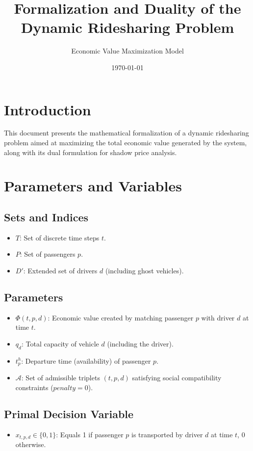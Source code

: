 \documentclass[12pt]{article}
\title{Formalization and Duality of the Dynamic Ridesharing Problem}
\author{Economic Value Maximization Model}
\date{\today}
\begin{document}
\maketitle

\section{Introduction}
This document presents the mathematical formalization of a dynamic ridesharing problem aimed at maximizing the total economic value generated by the system, along with its dual formulation for shadow price analysis.

\section{Parameters and Variables}

\subsection{Sets and Indices}
\begin{itemize}
    \item $T$: Set of discrete time steps $t$.
    \item $P$: Set of passengers $p$.
    \item $D'$: Extended set of drivers $d$ (including ghost vehicles).
\end{itemize}

\subsection{Parameters}
\begin{itemize}
    \item $\Phi(t, p, d)$: Economic value created by matching passenger $p$ with driver $d$ at time $t$.
    \item $q_d$: Total capacity of vehicle $d$ (including the driver).
    \item $t_p^h$: Departure time (availability) of passenger $p$.
    \item $\mathcal{A}$: Set of admissible triplets $(t, p, d)$ satisfying social compatibility constraints ($penalty = 0$).
\end{itemize}

\subsection{Primal Decision Variable}
\begin{itemize}
    \item $x_{t,p,d} \in \{0, 1\}$: Equals 1 if passenger $p$ is transported by driver $d$ at time $t$, 0 otherwise.
\end{itemize}
\end{document}
